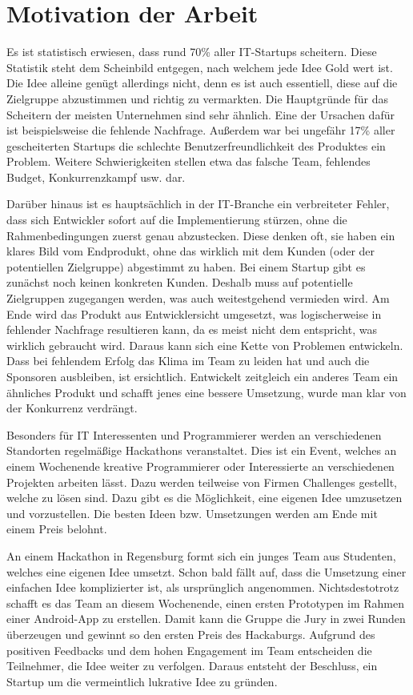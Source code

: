 \section{Motivation der Arbeit}
Es ist statistisch erwiesen, dass rund 70\% aller IT-Startups scheitern. \cite{CBInsights_failure} Diese Statistik steht dem Scheinbild entgegen, nach welchem jede Idee Gold wert ist. Die Idee alleine genügt allerdings nicht, denn es ist auch essentiell, diese auf die Zielgruppe abzustimmen und richtig zu vermarkten. Die Hauptgründe für das Scheitern der meisten Unternehmen sind sehr ähnlich. Eine der Ursachen dafür ist beispielsweise die fehlende Nachfrage. Außerdem war bei ungefähr 17\% aller gescheiterten Startups die schlechte Benutzerfreundlichkeit des Produktes ein Problem. Weitere Schwierigkeiten stellen etwa das falsche Team, fehlendes Budget, Konkurrenzkampf usw. dar. \cite{CBInsights_reasons}

Darüber hinaus ist es hauptsächlich in der IT-Branche ein verbreiteter Fehler, dass sich Entwickler sofort auf die Implementierung stürzen, ohne die Rahmenbedingungen zuerst genau abzustecken. Diese denken oft, sie haben ein klares Bild vom Endprodukt, ohne das wirklich mit dem Kunden (oder der potentiellen Zielgruppe) abgestimmt zu haben. Bei einem Startup gibt es zunächst noch keinen konkreten Kunden. Deshalb muss auf potentielle Zielgruppen zugegangen werden, was auch weitestgehend vermieden wird. Am Ende wird das Produkt aus Entwicklersicht umgesetzt, was logischerweise in fehlender Nachfrage resultieren kann, da es meist nicht dem entspricht, was wirklich gebraucht wird. Daraus kann sich eine Kette von Problemen entwickeln. Dass bei fehlendem Erfolg das Klima im Team zu leiden hat und auch die Sponsoren ausbleiben, ist ersichtlich. Entwickelt zeitgleich ein anderes Team ein ähnliches Produkt und schafft jenes eine bessere Umsetzung, wurde man klar von der Konkurrenz verdrängt.

Besonders für IT Interessenten und Programmierer werden an verschiedenen Standorten regelmäßige Hackathons veranstaltet. Dies ist ein Event, welches an einem Wochenende kreative Programmierer oder Interessierte an verschiedenen Projekten arbeiten lässt. Dazu werden teilweise von Firmen Challenges gestellt, welche zu lösen sind. Dazu gibt es die Möglichkeit, eine eigenen Idee umzusetzen und vorzustellen. Die besten Ideen bzw. Umsetzungen werden am Ende mit einem Preis belohnt. 

An einem Hackathon in Regensburg formt sich ein junges Team aus Studenten, welches eine eigenen Idee umsetzt. Schon bald fällt auf, dass die Umsetzung einer einfachen Idee komplizierter ist, als ursprünglich angenommen. Nichtsdestotrotz schafft es das Team an diesem Wochenende, einen ersten Prototypen im Rahmen einer Android-App zu erstellen. Damit kann die Gruppe die Jury in zwei Runden überzeugen und gewinnt so den ersten Preis des Hackaburgs. Aufgrund des positiven Feedbacks und dem hohen Engagement im Team entscheiden die Teilnehmer, die Idee weiter zu verfolgen. Daraus entsteht der Beschluss, ein Startup um die vermeintlich lukrative Idee zu gründen.

